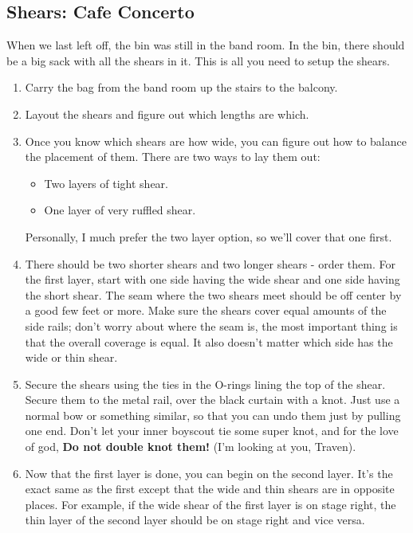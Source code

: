 \documentclass[11pt,a4paper]{book}
\begin{document}
\begin{enumerate}
\subsection{Shears: Cafe Concerto}
When we last left off, the bin was still in the band room. In the bin, there should be a big sack with all the shears in it. This is all you need to setup the shears.
\begin{enumerate}
\item Carry the bag from the band room up the stairs to the balcony.
\item Layout the shears and figure out which lengths are which.
\item Once you know which shears are how wide, you can figure out how to balance the placement of them. There are two ways to lay them out: 
\begin{itemize}
\item Two layers of tight shear.
\item One layer of very ruffled shear. 
\end{itemize}

Personally, I much prefer the two layer option, so we'll cover that one first. 

\item There should be two shorter shears and two longer shears - order them. For the first layer, start with one side having the wide shear and one side having the short shear. The seam where the two shears meet should be off center by a good few feet or more. Make sure the shears cover equal amounts of the side rails; don't worry about where the seam is, the most important thing is that the overall coverage is equal. It also doesn't matter which side has the wide or thin shear.
\item Secure the shears using the ties in the O-rings lining the top of the shear. Secure them to the metal rail, over the black curtain with a knot. Just use a normal bow or something similar, so that you can undo them just by pulling one end. Don't let your inner boyscout tie some super knot, and for the love of god, \textbf{Do not double knot them!} (I'm looking at you, Traven).
\item Now that the first layer is done, you can begin on the second layer. It's the exact same as the first except that the wide and thin shears are in opposite places. For example, if the wide shear of the first layer is on stage right, the thin layer of the second layer should be on stage right and vice versa.  
\end{enumerate}

\end{enumerate}
\end{document}
